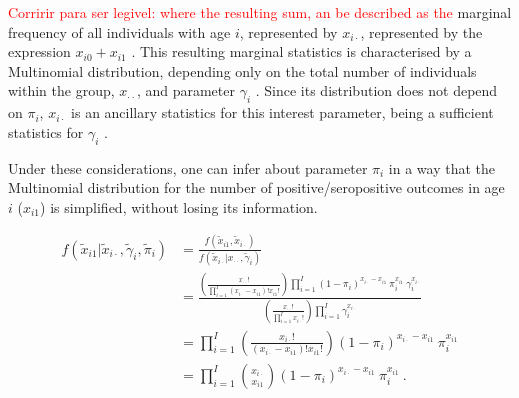 %
\noindent
\textcolor{red}{ Corririr para ser legivel: where the resulting sum, an be described as the} marginal frequency of all individuals with age $i$, represented by $x_{i\cdot}$, represented by the expression $x_{i0}+x_{i1}$ .
This resulting marginal statistics is characterised by a Multinomial distribution, depending only on the total number of individuals within the group, $x_{\cdot\cdot}$, and parameter $\gamma_i$ .
Since its distribution does not depend on $\pi_i$, $x_{i\cdot}$ is an ancillary statistics for this interest parameter, being a sufficient statistics for $\gamma_i$ \cite{casella2002statistical}.

Under these considerations, one can infer about parameter $\pi_i$ in a way that the Multinomial distribution for the number of positive/seropositive outcomes in age $i$ ($x_{i1}$) is simplified, without losing its information.

\newpage

\begin{equation}
\label{eq:binom}
\begin{split}
f\left(\tilde{x}_{i1} | \tilde{x}_{i\cdot}, \tilde{\gamma}_{i},\tilde{\pi}_{i}\right) &=
\frac{f(\tilde{x}_{i1},\tilde{x}_{i\cdot})} {f(\tilde{x}_{i\cdot} | x_{\cdot\cdot}, \tilde{\gamma}_{i})} \\
& = \frac{\left(\frac{x_{\cdot\cdot}!}{\prod_{i=1}^I (x_{i\cdot}-x_{i1})!x_{i1}!}\right) \prod_{i=1}^I (1-\pi_i)^{x_{i\cdot}-x_{i1}}\ \pi_i^{x_{i1}}\ \gamma_i^{x_{i\cdot}}} {\left(\frac{x_{\cdot\cdot}!}{\prod_{i=1}^I x_{i\cdot}!}\right) \prod_{i=1}^I \gamma_i^{x_{i\cdot}}} \\
& = \prod_{i=1}^I \left(\frac{x_{i\cdot}!}{(x_{i\cdot}-x_{i1})!x_{i1}!}\right) (1-\pi_i)^{x_{i\cdot}-x_{i1}}\ \pi_i^{x_{i1}} \\
& = \prod_{i=1}^I \binom{x_{i\cdot}}{x_{i1}} (1-\pi_i)^{x_{i\cdot}-x_{i1}}\ \pi_i^{x_{i1}}\ .
\end{split}
\end{equation}

